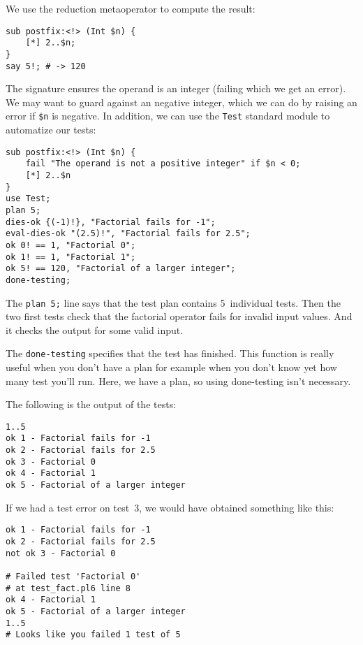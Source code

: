 We use the reduction metaoperator to compute the result:

\begin{verbatim}
sub postfix:<!> (Int $n) {
    [*] 2..$n;
}
say 5!; # -> 120
\end{verbatim}

The signature ensures the operand is an integer (failing which 
we get an error). We may want to guard against an 
negative integer, which we can do by raising an error if 
\verb'$n' is negative. In addition, we can use the {\tt Test} 
standard module to automatize our tests:

\begin{verbatim}
sub postfix:<!> (Int $n) {
    fail "The operand is not a positive integer" if $n < 0;
    [*] 2..$n
}
use Test;
plan 5;
dies-ok {(-1)!}, "Factorial fails for -1";
eval-dies-ok "(2.5)!", "Factorial fails for 2.5";
ok 0! == 1, "Factorial 0";
ok 1! == 1, "Factorial 1";
ok 5! == 120, "Factorial of a larger integer";
done-testing;
\end{verbatim}

The {\tt plan 5;} line says that the test plan contains 
5~individual tests. Then the two first tests check that 
the factorial operator fails for invalid input values. And 
it checks the output for some valid input.

The {\tt done-testing} specifies that the test has finished. 
This function is really useful when you don't have a plan 
for example when you don't know yet how many test you'll run. 
Here, we have a plan, so using done-testing isn't necessary.

The following is the output of the tests:

\begin{verbatim}
1..5
ok 1 - Factorial fails for -1
ok 2 - Factorial fails for 2.5
ok 3 - Factorial 0
ok 4 - Factorial 1
ok 5 - Factorial of a larger integer
\end{verbatim}

If we had a test error on test~3, we would have obtained 
something like this:

\begin{verbatim}
ok 1 - Factorial fails for -1
ok 2 - Factorial fails for 2.5
not ok 3 - Factorial 0

# Failed test 'Factorial 0'
# at test_fact.pl6 line 8
ok 4 - Factorial 1
ok 5 - Factorial of a larger integer
1..5
# Looks like you failed 1 test of 5
\end{verbatim}

